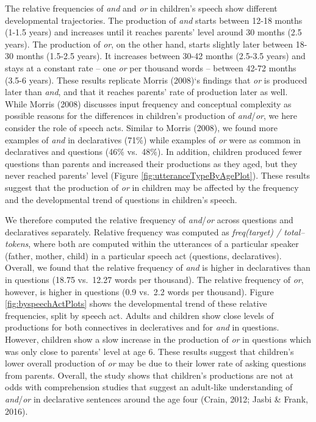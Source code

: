 \documentclass[10pt, letterpaper]{article}
\begin{document}
The relative frequencies of \emph{and} and \emph{or} in children's
speech show different developmental trajectories. The production of
\emph{and} starts between 12-18 months (1-1.5 years) and increases until
it reaches parents' level around 30 months (2.5 years). The production
of \emph{or}, on the other hand, starts slightly later between 18-30
months (1.5-2.5 years). It increases between 30-42 months (2.5-3.5
years) and stays at a constant rate -- one \emph{or} per thousand words
-- between 42-72 months (3.5-6 years). These results replicate Morris
(2008)`s findings that \emph{or} is produced later than \emph{and}, and
that it reaches parents' rate of production later as well. While Morris
(2008) discusses input frequency and conceptual complexity as possible
reasons for the differences in children's production of
\emph{and}/\emph{or}, we here consider the role of speech acts. Similar
to Morris (2008), we found more examples of \emph{and} in declaratives
(71\%) while examples of \emph{or} were as common in declaratives and
questions (46\% vs.~48\%). In addition, children produced fewer
questions than parents and increased their productions as they aged, but
they never reached parents' level (Figure
\ref{fig:utteranceTypeByAgePlot}). These results suggest that the
production of \emph{or} in children may be affected by the frequency and
the developmental trend of questions in children's speech.

We therefore computed the relative frequency of \emph{and}/\emph{or}
across questions and declaratives separately. Relative frequency was
computed as \emph{freq(target) / total--tokens}, where both are computed
within the utterances of a particular speaker (father, mother, child) in
a particular speech act (questions, declaratives). Overall, we found
that the relative frequency of \emph{and} is higher in declaratives than
in questions (18.75 vs.~12.27 words per thousand). The relative
frequency of \emph{or}, however, is higher in questions (0.9 vs.~2.2
words per thousand). Figure \ref{fig:byspeechActPlots} shows the
developmental trend of these relative frequencies, split by speech act.
Adults and children show close levels of productions for both
connectives in decleratives and for \emph{and} in questions. However,
children show a slow increase in the production of \emph{or} in
questions which was only close to parents' level at age 6. These results
suggest that children's lower overall production of \emph{or} may be due
to their lower rate of asking questions from parents. Overall, the study
shows that children's productions are not at odds with comprehension
studies that suggest an adult-like understanding of \emph{and}/\emph{or}
in declarative sentences around the age four (Crain, 2012; Jasbi \&
Frank, 2016).
\end{document}
